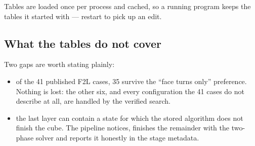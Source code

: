 Tables are loaded once per process and cached, so a running program keeps the tables
it started with --- restart to pick up an edit.

\subsection{What the tables do not cover}

Two gaps are worth stating plainly:

\begin{itemize}[leftmargin=1.4em]
  \item of the 41 published F2L cases, 35 survive the ``face turns only''
  preference.  Nothing is lost: the other six, and every configuration the 41 cases
  do not describe at all, are handled by the verified search.
  \item the last layer can contain a state for which the stored algorithm does not
  finish the cube.  The pipeline notices, finishes the remainder with the two-phase
  solver and reports it honestly in the stage metadata.
\end{itemize}
